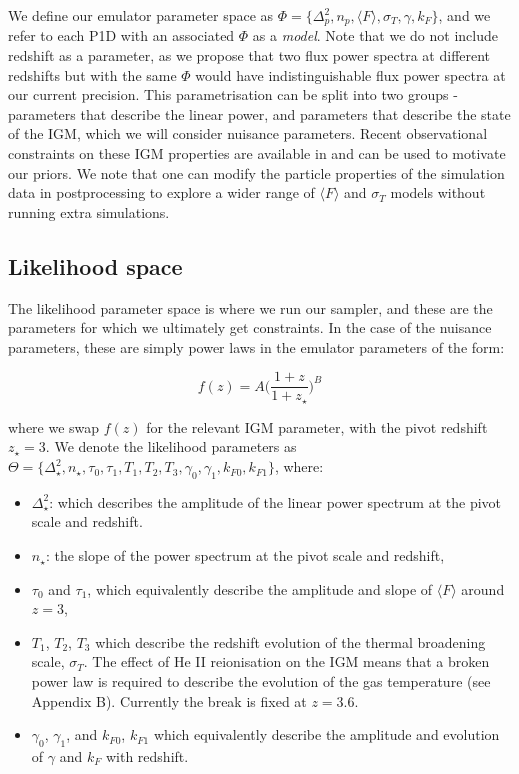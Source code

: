 \documentclass[]{article}
\begin{document}
\noindent We define our emulator parameter space as $\Phi=\{ \Delta^2_p,n_p,\langle F\rangle,\sigma_T,\gamma,k_F \}$, and we refer to each P1D with an associated 
$\Phi$ as a \textit{model}. Note that we do not include redshift as a parameter, as we 
propose that two flux power spectra at different redshifts but with the same $\Phi$ would 
have indistinguishable flux power spectra at our current precision. This parametrisation 
can be split into two groups - parameters that describe the linear power, and parameters 
that describe the state of the IGM, which we will consider nuisance parameters. Recent 
observational constraints on these IGM properties are available in \cite{Walther2018} and 
can be used to motivate our priors. We note that one can modify the particle properties 
of the simulation data in postprocessing to explore a wider range of $\langle F\rangle$ 
and $\sigma_T$ models without running extra simulations.

\subsection{Likelihood space}
The likelihood parameter space is where we run our sampler, and these are the parameters 
for which we ultimately get constraints. In the case of the nuisance parameters,
these are simply power laws in the emulator parameters of the form:

\begin{equation}
    f(z)=A\bigg(\frac{1+z}{1+z_\star}\bigg)^B
\end{equation}

\noindent where we swap $f(z)$ for the relevant IGM parameter, with the pivot 
redshift $z_\star=3$. We denote the likelihood parameters as
$\Theta=\{ \Delta^2_\star, n_\star, \tau_0, \tau_1, T_1, T_2, T_3, \gamma_0, \gamma_1, k_{F0}, k_{F1} \}$, where:

\begin{itemize}
    \item $\Delta^2_\star$: which describes the amplitude of the linear power spectrum at 
    the pivot scale and redshift.
    \item $n_\star$: the slope of the power spectrum at the pivot scale and redshift,
    \item  $\tau_0$ and $\tau_1$, which equivalently describe the amplitude and slope of $\langle F\rangle$ around $z=3$,
    \item  $T_1$, $T_2$, $T_3$ which describe the redshift evolution of the thermal 
    broadening scale, $\sigma_T$. The effect of He II reionisation on the IGM means that 
    a broken power law is required to describe the evolution of the gas temperature (see 
    Appendix B). Currently the break is fixed at $z=3.6$.
    \item $\gamma_0$, $\gamma_1$, and $k_{F0}$, $k_{F1}$ which equivalently describe the amplitude and evolution of $\gamma$ and $k_F$ with redshift.
\end{itemize}
\end{document}
